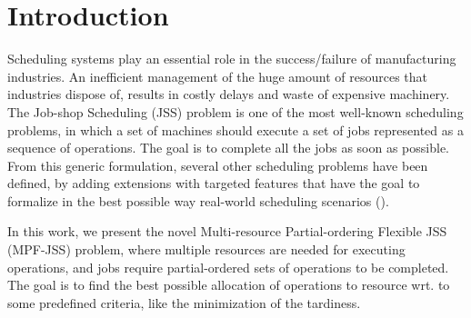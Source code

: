 \documentclass[submission,copyright,creativecommons]{eptcs}
\begin{document}
\section{Introduction}
Scheduling systems play an essential role in the success/failure of manufacturing industries. An inefficient management of the huge amount of resources that industries dispose of, results in costly delays and waste of expensive machinery. The Job-shop Scheduling (JSS) problem is one of the most well-known scheduling problems, in which a set of machines should execute a set of jobs represented as a sequence of operations. The goal is to complete all the jobs as soon as possible. From this generic formulation, several other scheduling problems have been defined, by adding extensions with targeted features that have the goal to formalize in the best possible way real-world scheduling scenarios (\cite{brucker1990job}). %

In this work, we present the novel Multi-resource Partial-ordering Flexible JSS (MPF-JSS) problem, where multiple resources are needed for executing operations, and jobs require partial-ordered sets of operations to be completed. %
The goal is to find the best possible allocation of operations to resource wrt. to some predefined criteria, like the minimization of the tardiness. 
\end{document}
